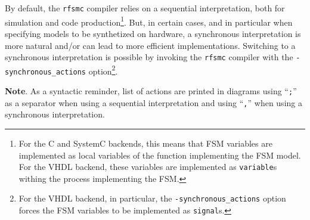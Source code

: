 \medskip
By default, the \verb|rfsmc| compiler relies on a sequential interpretation, both for simulation and
code production\footnote{For the C and SystemC backends, this means that FSM variables are
  implemented as local variables of the function implementing the FSM model. For the VHDL backend,
  these variables are implemented as \texttt{variable}s withing the process implementing the
  FSM.}. But, in certain cases, and in particular when specifying models to be synthetized on
hardware, a synchronous interpretation is more natural and/or can lead to more efficient
implementations. Switching to a synchronous interpretation is possible by invoking the \verb|rfsmc|
compiler with the \verb|-synchronous_actions| option\footnote{For the VHDL backend, in particular, the
  \texttt{-synchronous\_actions} option forces the FSM variables to be implemented as
  \texttt{signal}s.}.  

\medskip
\textbf{Note}. As a syntactic reminder, list of actions are printed in diagrams using ``\verb|;|'' as a separator when using
a sequential interpretation and using ``\verb|,|'' when using a synchronous interpretation.

